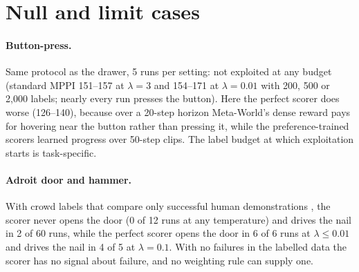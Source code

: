 \documentclass{article}
\theoremstyle{plain}
\theoremstyle{remark}
\begin{document}


\section{Null and limit cases}
\label{app:null}

\paragraph{Button-press.} Same protocol as the drawer, 5 runs per setting: not exploited at any budget (standard MPPI
151--157 at $\lambda=3$ and 154--171 at $\lambda=0.01$ with 200, 500 or 2,000 labels; nearly every run presses the
button). Here the perfect scorer does worse (126--140), because over a 20-step horizon Meta-World's dense reward pays
for hovering near the button rather than pressing it, while the preference-trained scorers learned progress over 50-step
clips. The label budget at which exploitation starts is task-specific.

\paragraph{Adroit door and hammer.} With crowd labels that compare only successful human demonstrations
\citep{rajeswaran2018learning,yuan2024unirlhf}, the scorer never opens the door (0 of 12 runs at any temperature) and
drives the nail in 2 of 60 runs, while the perfect scorer opens the door in 6 of 6 runs at $\lambda\le0.01$ and drives
the nail in 4 of 5 at $\lambda=0.1$. With no failures in the labelled data the scorer has no signal about failure, and
no weighting rule can supply one.
\end{document}
